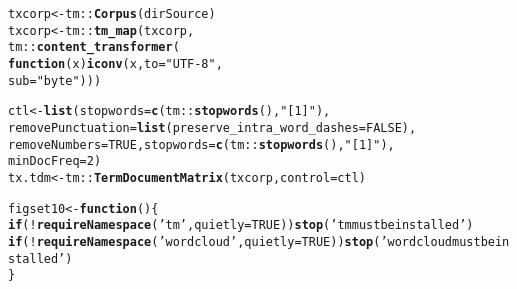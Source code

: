 \documentclass[12pt, a4paper,  BCOR=8.25mm, DIV=15]{scrartcl}\usepackage[]{graphicx}\usepackage[]{color}
\makeatletter
\newcommand{\hlnum}[1]{\textcolor[rgb]{0.686,0.059,0.569}{#1}}%
\newcommand{\hlstr}[1]{\textcolor[rgb]{0.192,0.494,0.8}{#1}}%
\newcommand{\hlopt}[1]{\textcolor[rgb]{0,0,0}{#1}}%
\newcommand{\hlstd}[1]{\textcolor[rgb]{0.345,0.345,0.345}{#1}}%
\newcommand{\hlkwa}[1]{\textcolor[rgb]{0.161,0.373,0.58}{\textbf{#1}}}%
\newcommand{\hlkwb}[1]{\textcolor[rgb]{0.69,0.353,0.396}{#1}}%
\newcommand{\hlkwc}[1]{\textcolor[rgb]{0.333,0.667,0.333}{#1}}%
\newcommand{\hlkwd}[1]{\textcolor[rgb]{0.737,0.353,0.396}{\textbf{#1}}}%
\newenvironment{kframe}{%
 \def\at@end@of@kframe{}%
 \ifinner\ifhmode%
  \def\at@end@of@kframe{\end{minipage}}%
  \begin{minipage}{\columnwidth}%
 \fi\fi%
 \def\FrameCommand##1{\hskip\@totalleftmargin \hskip-\fboxsep
 \colorbox{shadecolor}{##1}\hskip-\fboxsep
     \hskip-\linewidth \hskip-\@totalleftmargin \hskip\columnwidth}%
 \MakeFramed {\advance\hsize-\width
   \@totalleftmargin\z@ \linewidth\hsize
   \@setminipage}}%
 {\par\unskip\endMakeFramed%
 \at@end@of@kframe}
\newenvironment{knitrout}{}{} %
\makeatother
\begin{document}
\begin{knitrout}
\color{fgcolor}\begin{kframe}
\begin{alltt}
\hlstd{txcorp} \hlkwb{<-} \hlstd{tm}\hlopt{::}\hlkwd{Corpus}\hlstd{(dirSource)}
\hlstd{txcorp} \hlkwb{<-} \hlstd{tm}\hlopt{::}\hlkwd{tm_map}\hlstd{(txcorp,}
                 \hlstd{tm}\hlopt{::}\hlkwd{content_transformer}\hlstd{(}
                     \hlkwa{function}\hlstd{(}\hlkwc{x}\hlstd{)} \hlkwd{iconv}\hlstd{(x,} \hlkwc{to}\hlstd{=}\hlstr{"UTF-8"}\hlstd{,}
                                       \hlkwc{sub} \hlstd{=} \hlstr{"byte"}\hlstd{)))}
\end{alltt}
\end{kframe}
\end{knitrout}
\begin{knitrout}
\color{fgcolor}\begin{kframe}
\begin{alltt}
\hlstd{ctl} \hlkwb{<-} \hlkwd{list}\hlstd{(}\hlkwc{stopwords} \hlstd{=} \hlkwd{c}\hlstd{(tm}\hlopt{::}\hlkwd{stopwords}\hlstd{(),} \hlstr{"[1]"}\hlstd{),}
            \hlkwc{removePunctuation} \hlstd{=} \hlkwd{list}\hlstd{(}\hlkwc{preserve_intra_word_dashes} \hlstd{=} \hlnum{FALSE}\hlstd{),}
            \hlkwc{removeNumbers} \hlstd{=} \hlnum{TRUE}\hlstd{,} \hlkwc{stopwords}\hlstd{=}\hlkwd{c}\hlstd{(tm}\hlopt{::}\hlkwd{stopwords}\hlstd{(),} \hlstr{"[1]"}\hlstd{),}
            \hlkwc{minDocFreq} \hlstd{=} \hlnum{2}\hlstd{)}
\hlstd{tx.tdm} \hlkwb{<-} \hlstd{tm}\hlopt{::}\hlkwd{TermDocumentMatrix}\hlstd{(txcorp,} \hlkwc{control}\hlstd{=ctl)}
\end{alltt}
\end{kframe}
\end{knitrout}
\begin{knitrout}
\color{fgcolor}\begin{kframe}
\begin{alltt}
\hlstd{figset10} \hlkwb{<-} \hlkwa{function}\hlstd{()\{}
  \hlkwa{if}\hlstd{(}\hlopt{!}\hlkwd{requireNamespace}\hlstd{(}\hlstr{'tm'}\hlstd{,} \hlkwc{quietly} \hlstd{=} \hlnum{TRUE}\hlstd{))}\hlkwd{stop}\hlstd{(}\hlstr{'tm must be installed'}\hlstd{)}
  \hlkwa{if}\hlstd{(}\hlopt{!}\hlkwd{requireNamespace}\hlstd{(}\hlstr{'wordcloud'}\hlstd{,} \hlkwc{quietly}\hlstd{=}\hlnum{TRUE}\hlstd{))}\hlkwd{stop}\hlstd{(}\hlstr{'wordcloud must be installed'}\hlstd{)}
  \hlstd{\}}
\end{alltt}
\end{kframe}
\end{knitrout}
\end{document}
